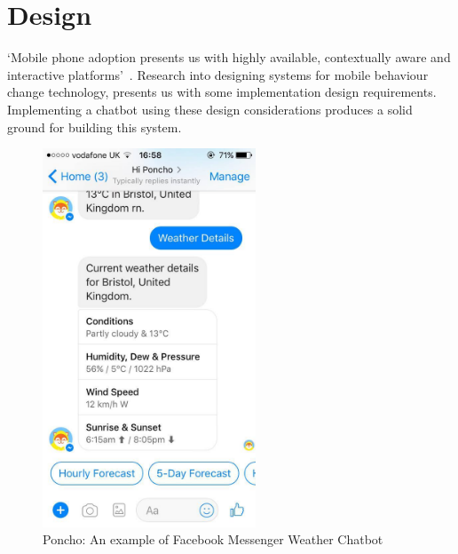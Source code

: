 
\newpage
\section{Design}
`Mobile phone adoption presents us with highly available, contextually aware and interactive platforms'~\cite{article_mhealth}. Research into designing systems for mobile behaviour change technology, presents us with some implementation design requirements. Implementing a chatbot using these design considerations produces a solid ground for building this system.\newline
\newline

\begin{figure}[ht] %
    \centering
    \includegraphics[width=2.5in]{../resources/poncho.jpg}
    \caption{Poncho: An example of Facebook Messenger Weather Chatbot}
    \label{fig:poncho}
\end{figure}


